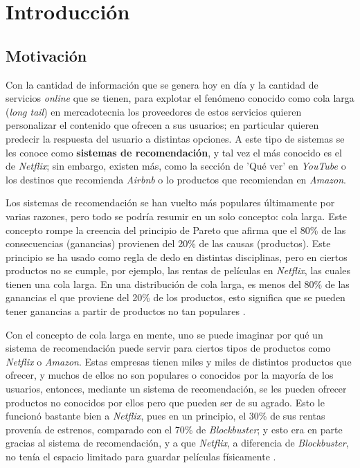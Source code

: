 
\chapter{Introducción}
\label{ch:intro}

\section{Motivación} \label{motivacion}

Con la cantidad de información que se genera hoy en día y la cantidad de servicios \textit{online} que se tienen, para explotar el fenómeno conocido como cola larga (\textit{long tail}) en mercadotecnia los proveedores de estos servicios quieren personalizar el contenido que ofrecen a sus usuarios; en particular quieren predecir la respuesta del usuario a distintas opciones. A este tipo de sistemas se les conoce como \textbf{sistemas de recomendación}, y tal vez el más conocido es el de \textit{Netflix}; sin embargo, existen más, como la sección de 'Qué ver' en \textit{YouTube} o los destinos que recomienda \textit{Airbnb} o lo productos que recomiendan en \textit{Amazon}.

Los sistemas de recomendación se han vuelto más populares últimamente por varias razones, pero todo se podría resumir en un solo concepto: cola larga. Este concepto rompe la creencia del principio de Pareto que afirma que el 80\% de las consecuencias (ganancias) provienen del 20\% de las causas (productos). Este principio se ha usado como regla de dedo en distintas disciplinas, pero en ciertos productos no se cumple, por ejemplo, las rentas de películas en \textit{Netflix}, las cuales tienen una cola larga. En una distribución de cola larga, es menos del 80\% de las ganancias el que proviene del 20\% de los productos, esto significa que se pueden tener ganancias a partir de productos no tan populares \cite{anderson2006long}. %

Con el concepto de cola larga en mente, uno se puede imaginar por qué un sistema de recomendación puede servir para ciertos tipos de productos como \textit{Netflix} o \textit{Amazon}. Estas empresas tienen miles y miles de distintos productos que ofrecer, y muchos de ellos no son populares o conocidos por la mayoría de los usuarios, entonces, mediante un sistema de recomendación, se les pueden ofrecer productos no conocidos por ellos pero que pueden ser de su agrado. Esto le funcionó bastante bien a \textit{Netflix}, pues en un principio, el 30\% de sus rentas provenía de estrenos, comparado con el 70\% de \textit{Blockbuster}; y esto era en parte gracias al sistema de recomendación, y a que \textit{Netflix}, a diferencia de \textit{Blockbuster}, no tenía el espacio limitado para guardar películas físicamente \cite{bloombergnetflixsales}.

